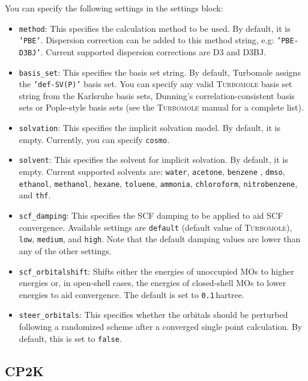 \documentclass[]{tufte-book}
\begin{document}
You can specify the following settings in the settings block:
\begin{itemize}
\item \texttt{method}:
This specifies the calculation method to be used. By default, it is \texttt{'PBE'}. Dispersion correction can be added to this method string, e.g: \texttt{'PBE-D3BJ'}. Current supported dispersion corrections are D3\cite{grimmeD3} and D3BJ.\cite{bjDamping}
\item \texttt{basis\_set}: This specifies the basis set string. By default, Turbomole assigns the \texttt{'def-SV(P)'} basis set. You can specify any valid \textsc{Turbomole} basis set string from the Karlsruhe basis sets\cite{karlsruheBasisSets}, Dunning's correlation-consistent basis sets\cite{dunningBasisSets} or Pople-style basis sets\cite{popleBasisSets} (see the \textsc{Turbomole} manual for a complete list).
\item \texttt{solvation}: This specifies the implicit solvation model. By default, it is empty. Currently, you can specify \texttt{cosmo}.
\item \texttt{solvent}: This specifies the solvent for implicit solvation. By default, it is empty. Current supported solvents are: \texttt{water}, \texttt{acetone}, \texttt{benzene}
, \texttt{dmso}, \texttt{ethanol}, \texttt{methanol}, \texttt{hexane}, \texttt{toluene}, \texttt{ammonia}, \texttt{chloroform}, \texttt{nitrobenzene}, and \texttt{thf}.
\item \texttt{scf\_damping}: This specifies the SCF damping to be applied to aid SCF convergence. Available settings are \texttt{default} (default value of \textsc{Turbomole}), \texttt{low}, \texttt{medium}, and \texttt{high}. Note that the default damping values are lower than any of the other settings.
\item \texttt{scf\_orbitalshift}: Shifts either the energies of unoccupied MOs to higher energies or, in open-shell cases, the energies of closed-shell MOs to lower energies to aid convergence. The default is set to \texttt{0.1}\,hartree.
\item \texttt{steer\_orbitals}: This specifies whether the orbitals should be perturbed  following a randomized scheme after a converged single point calculation\cite{orbitalperturbation}. By default, this is set to \texttt{false}.
\end{itemize}

\subsection{\textsc{CP2K}}
\end{document}
